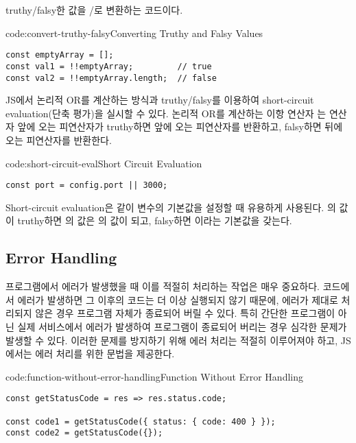 \는 truthy/falsy한 값을 /로 변환하는 코드이다.

\begin{codeenv}{code:convert-truthy-falsy}{Converting Truthy and Falsy Values}\begin{verbatim}
const emptyArray = [];
const val1 = !!emptyArray;         // true
const val2 = !!emptyArray.length;  // false
\end{verbatim}
\end{codeenv}

JS에서 논리적 OR를 계산하는 방식과 truthy/falsy를 이용하여 short-circuit evaluation(단축 평가)을 실시할 수 있다. 논리적 OR를 계산하는 이항 연산자 \cd{||}는 연산자 앞에 오는 피연산자가 truthy하면 앞에 오는 피연산자를 반환하고, falsy하면 뒤에 오는 피연산자를 반환한다.

\begin{codeenv}{code:short-circuit-eval}{Short Circuit Evaluation}\begin{verbatim}
const port = config.port || 3000;
\end{verbatim}
\end{codeenv}

Short-circuit evaluation은 \과 같이 변수의 기본값을 설정할 때 유용하게 사용된다. 의 값이 truthy하면 의 값은 의 값이 되고, falsy하면 이라는 기본값을 갖는다.
\newpage

\subsection*{Error Handling}

프로그램에서 에러가 발생했을 때 이를 적절히 처리하는 작업은 매우 중요하다. 코드에서 에러가 발생하면 그 이후의 코드는 더 이상 실행되지 않기 때문에, 에러가 제대로 처리되지 않은 경우 프로그램 자체가 종료되어 버릴 수 있다. 특히 간단한 프로그램이 아닌 실제 서비스에서 에러가 발생하여 프로그램이 종료되어 버리는 경우 심각한 문제가 발생할 수 있다. 이러한 문제를 방지하기 위해 에러 처리는 적절히 이루어져야 하고, JS에서는 에러 처리를 위한 문법을 제공한다.

\begin{codeenv}{code:function-without-error-handling}{Function Without Error Handling}\begin{verbatim}
const getStatusCode = res => res.status.code;

const code1 = getStatusCode({ status: { code: 400 } });
const code2 = getStatusCode({});
\end{verbatim}
\end{codeenv}

